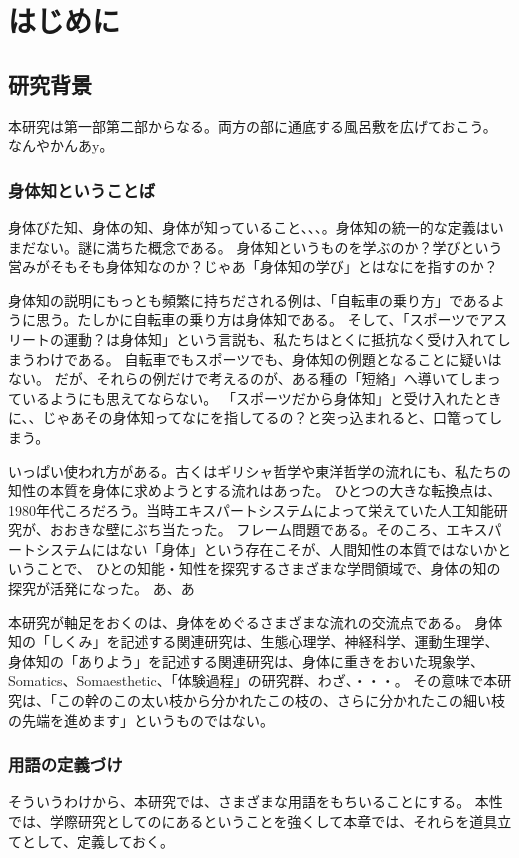 \part*{はじめに}
\chapter{研究背景}
本研究は第一部第二部からなる。両方の部に通底する風呂敷を広げておこう。
なんやかんあy。
\section{身体知ということば}
身体びた知、身体の知、身体が知っていること、、、。身体知の統一的な定義はいまだない。謎に満ちた概念である。
身体知というものを学ぶのか？学びという営みがそもそも身体知なのか？じゃあ「身体知の学び」とはなにを指すのか？

身体知の説明にもっとも頻繁に持ちだされる例は、「自転車の乗り方」であるように思う。たしかに自転車の乗り方は身体知である。
そして、「スポーツでアスリートの運動？は身体知」という言説も、私たちはとくに抵抗なく受け入れてしまうわけである。
自転車でもスポーツでも、身体知の例題となることに疑いはない。
だが、それらの例だけで考えるのが、ある種の「短絡」へ導いてしまっているようにも思えてならない。
「スポーツだから身体知」と受け入れたときに、、じゃあその身体知ってなにを指してるの？と突っ込まれると、口篭ってしまう。




いっぱい使われ方がある。古くはギリシャ哲学や東洋哲学の流れにも、私たちの知性の本質を身体に求めようとする流れはあった。
ひとつの大きな転換点は、1980年代ころだろう。当時エキスパートシステムによって栄えていた人工知能研究が、おおきな壁にぶち当たった。
フレーム問題である。そのころ、エキスパートシステムにはない「身体」という存在こそが、人間知性の本質ではないかということで、
ひとの知能・知性を探究するさまざまな学問領域で、身体の知の探究が活発になった。
あ、あ

本研究が軸足をおくのは、身体をめぐるさまざまな流れの交流点である。
身体知の「しくみ」を記述する関連研究は、生態心理学、神経科学、運動生理学、
身体知の「ありよう」を記述する関連研究は、身体に重きをおいた現象学、Somatics、Somaesthetic、「体験過程」の研究群、わざ、・・・。
その意味で本研究は、「この幹のこの太い枝から分かれたこの枝の、さらに分かれたこの細い枝の先端を進めます」というものではない。

\section{用語の定義づけ}
そういうわけから、本研究では、さまざまな用語をもちいることにする。
本性では、学際研究としてのにあるということを強くして本章では、それらを道具立てとして、定義しておく。

